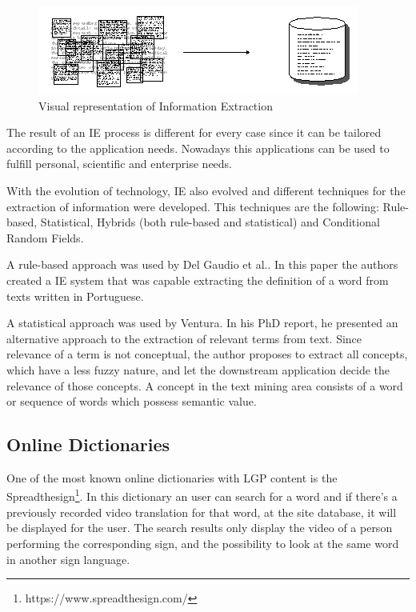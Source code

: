 \begin{figure}[H]
\centering
\includegraphics[scale=0.65]{ch2/assets/extract.png}
    \caption[InformationExtraction]{Visual representation of Information Extraction\cite{gate2019}}
\label{fig:iext}
\end{figure}

The result of an IE process is different for every case since it can be tailored according to the application needs.
Nowadays this applications can be used to fulfill personal, scientific and enterprise needs.

With the evolution of technology, IE also evolved and different techniques for the extraction of information were developed.
This techniques are the following: Rule-based, Statistical, Hybrids (both rule-based and statistical) and Conditional Random Fields\cite{sarawagi2008information}.

A rule-based approach was used by Del Gaudio et al.\cite{del2007automatic}.
In this paper the authors created a IE system that was capable extracting the definition of a word from texts written in Portuguese.

A statistical approach was used by Ventura\cite{ventura2014automatic}.
In his PhD report, he presented an alternative approach to the extraction of relevant terms from text.
Since relevance of a term is not conceptual, the author proposes to extract all concepts, which have a less fuzzy nature, and let the downstream application decide the relevance of those concepts.
A concept in the text mining area consists of a word or sequence of words which possess semantic value.

\subsection{Online Dictionaries}

One of the most known online dictionaries with \gls{LGP} content is the Spreadthesign\footnote{https://www.spreadthesign.com/}.
In this dictionary an user can search for a word and if there's a previously recorded video translation for that word, at the site database, it will be displayed for the user.
The search results only display the video of a person performing the corresponding sign, and the possibility to look at the same word in another sign language.

